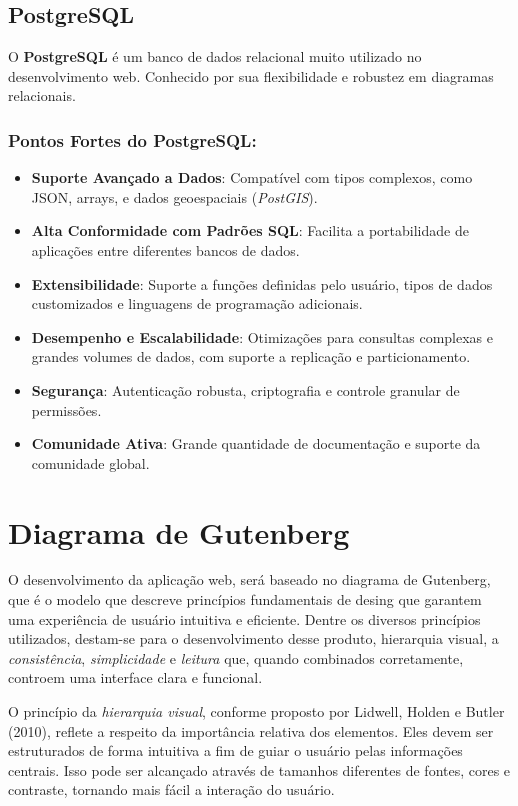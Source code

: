 \subsection{PostgreSQL}

O \textbf{PostgreSQL} é um banco de dados relacional muito utilizado no desenvolvimento web. Conhecido por sua flexibilidade e robustez em diagramas relacionais. 

\subsubsection*{Pontos Fortes do PostgreSQL:}
\begin{itemize}
    \item \textbf{Suporte Avançado a Dados}: Compatível com tipos complexos, como JSON, arrays, e dados geoespaciais (\textit{PostGIS}).
    \item \textbf{Alta Conformidade com Padrões SQL}: Facilita a portabilidade de aplicações entre diferentes bancos de dados.
    \item \textbf{Extensibilidade}: Suporte a funções definidas pelo usuário, tipos de dados customizados e linguagens de programação adicionais.
    \item \textbf{Desempenho e Escalabilidade}: Otimizações para consultas complexas e grandes volumes de dados, com suporte a replicação e particionamento.
    \item \textbf{Segurança}: Autenticação robusta, criptografia e controle granular de permissões.
    \item \textbf{Comunidade Ativa}: Grande quantidade de documentação e suporte da comunidade global.
\end{itemize}

\section{Diagrama de Gutenberg}

O desenvolvimento da aplicação web, será baseado no diagrama de Gutenberg, que é o modelo que descreve princípios fundamentais de desing que garantem uma experiência de usuário intuitiva e eficiente. Dentre os diversos princípios utilizados, destam-se para o desenvolvimento desse produto, {hierarquia visual}, a \textit{consistência}, \textit{simplicidade} e \textit{leitura} que, quando combinados corretamente, controem uma interface clara e funcional.

O princípio da \textit{hierarquia visual}, conforme proposto por Lidwell, Holden e Butler (2010), reflete a respeito da importância relativa dos elementos. Eles devem ser estruturados de forma intuitiva a fim de guiar o usuário pelas informações centrais. Isso pode ser alcançado através de tamanhos diferentes de fontes, cores  e contraste, tornando mais fácil a interação do usuário.

